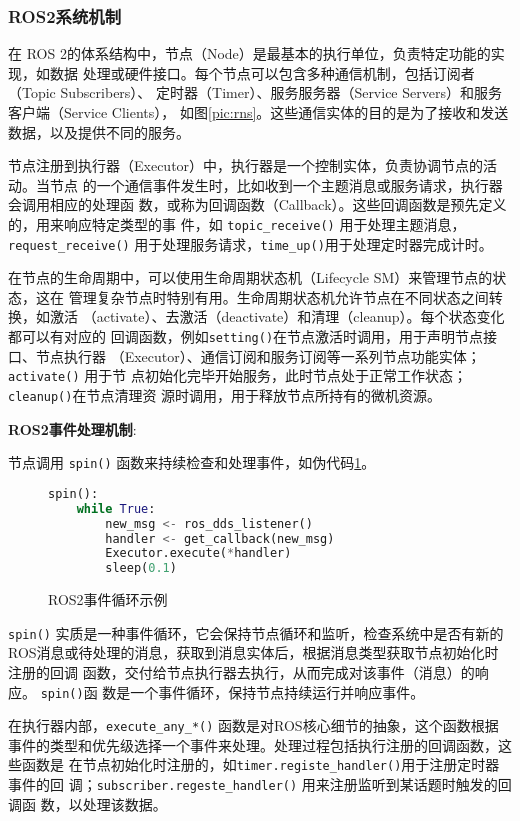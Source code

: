 \subsubsection{ROS2系统机制}
在 ROS 2的体系结构中，节点（Node）是最基本的执行单位，负责特定功能的实现，如数据
处理或硬件接口。每个节点可以包含多种通信机制，包括订阅者（Topic Subscribers）、
定时器（Timer）、服务服务器（Service Servers）和服务客户端（Service Clients），
如图\ref{pic:rns}。这些通信实体的目的是为了接收和发送数据，以及提供不同的服务。

节点注册到执行器（Executor）中，执行器是一个控制实体，负责协调节点的活动。当节点
的一个通信事件发生时，比如收到一个主题消息或服务请求，执行器会调用相应的处理函
数，或称为回调函数（Callback）。这些回调函数是预先定义的，用来响应特定类型的事
件，如 \texttt{topic\_receive()} 用于处理主题消息， \texttt{request\_receive()}
用于处理服务请求，\texttt{time\_up()}用于处理定时器完成计时。

在节点的生命周期中，可以使用生命周期状态机（Lifecycle SM）来管理节点的状态，这在
管理复杂节点时特别有用。生命周期状态机允许节点在不同状态之间转换，如激活
（activate）、去激活（deactivate）和清理（cleanup）。每个状态变化都可以有对应的
回调函数，例如\texttt{setting()}在节点激活时调用，用于声明节点接口、节点执行器
（Executor）、通信订阅和服务订阅等一系列节点功能实体；\texttt{activate()} 用于节
点初始化完毕开始服务，此时节点处于正常工作状态； \texttt{cleanup()}在节点清理资
源时调用，用于释放节点所持有的微机资源。

\textbf{ROS2事件处理机制}: 

节点调用 \texttt{spin()} 函数来持续检查和处理事件，如伪代码\ref{lst:rosspin}。

\begin{figure}[H]
\begin{lstlisting}[language=Python]
spin():
    while True:
        new_msg <- ros_dds_listener()
        handler <- get_callback(new_msg)
        Executor.execute(*handler)
        sleep(0.1)
\end{lstlisting}
\caption{ROS2事件循环示例}
\label{lst:rosspin}
\end{figure}

\texttt{spin()} 实质是一种事件循环，它会保持节点循环和监听，检查系统中是否有新的
ROS消息或待处理的消息，获取到消息实体后，根据消息类型获取节点初始化时注册的回调
函数，交付给节点执行器去执行，从而完成对该事件（消息）的响应。 \texttt{spin()}函
数是一个事件循环，保持节点持续运行并响应事件。

在执行器内部，\texttt{execute\_any\_*()} 函数是对ROS核心细节的抽象，这个函数根据
事件的类型和优先级选择一个事件来处理。处理过程包括执行注册的回调函数，这些函数是
在节点初始化时注册的，如\texttt{timer.registe\_handler()}用于注册定时器事件的回
调；\texttt{subscriber.regeste\_handler()} 用来注册监听到某话题时触发的回调函
数，以处理该数据。

